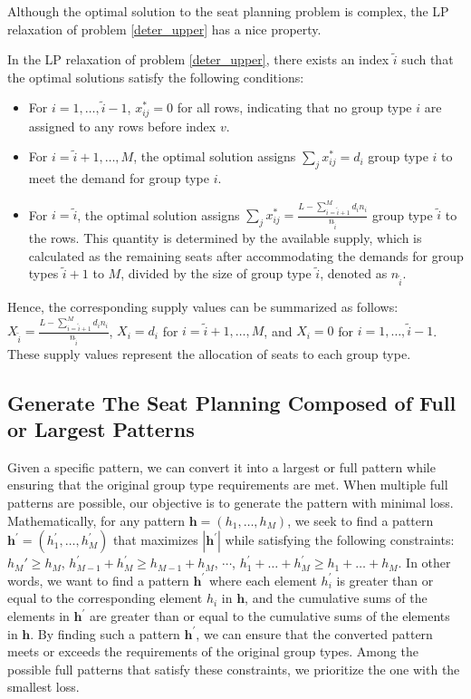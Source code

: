 Although the optimal solution to the seat planning problem is complex, the LP relaxation of problem \eqref{deter_upper} has a nice property.

\begin{prop}\label{sol_relax_deter}
In the LP relaxation of problem \eqref{deter_upper}, there exists an index $\tilde{i}$ such that the optimal solutions satisfy the following conditions:

\begin{itemize}
\item For $i = 1,\ldots, \tilde{i}-1$, $x_{ij}^{*} = 0$ for all rows, indicating that no group type $i$ are assigned to any rows before index $v$.
\item For $i = \tilde{i}+1,\ldots, M$, the optimal solution assigns $\sum_{j} x_{ij}^{*} = d_{i}$ group type $i$ to meet the demand for group type $i$.
\item For $i = \tilde{i}$, the optimal solution assigns $\sum_{j} x_{ij}^{*} = \frac{L - \sum_{i = \tilde{i}+1}^{M} {d_i n_i}}{n_{\tilde{i}}}$ group type $\tilde{i}$ to the rows. This quantity is determined by the available supply, which is calculated as the remaining seats after accommodating the demands for group types $\tilde{i}+1$ to $M$, divided by the size of group type $\tilde{i}$, denoted as $n_{\tilde{i}}$.
\end{itemize}

Hence, the corresponding supply values can be summarized as follows: $X_{\tilde{i}} = \frac{L - \sum_{i = \tilde{i}+1}^{M} {d_i n_i}}{n_{\tilde{i}}}$, $X_{i} = d_{i}$ for $i = \tilde{i} +1,\ldots, M$, and $X_{i} = 0$ for $i = 1, \ldots, \tilde{i}-1$. These supply values represent the allocation of seats to each group type.
\end{prop}

\subsection{Generate The Seat Planning Composed of Full or Largest Patterns}
Given a specific pattern, we can convert it into a largest or full pattern while ensuring that the original group type requirements are met. When multiple full patterns are possible, our objective is to generate the pattern with minimal loss. Mathematically, for any pattern $\bm{h} = (h_1, \ldots, h_M)$, we seek to find a pattern $\bm{h}^{'} = (h_1^{'}, \ldots, h_M^{'})$ that maximizes $|\bm{h}^{'}|$ while satisfying the following constraints: $h_M{'} \geq h_M$, $h_{M-1}^{'} + h_{M}^{'} \geq h_{M-1} + h_{M}$, $\cdots$, $h_1^{'} + \ldots + h_M^{'} \geq h_1 + \ldots + h_M$. In other words, we want to find a pattern $\bm{h}^{'}$ where each element $h_i^{'}$ is greater than or equal to the corresponding element $h_i$ in $\bm{h}$, and the cumulative sums of the elements in $\bm{h}^{'}$ are greater than or equal to the cumulative sums of the elements in $\bm{h}$.
By finding such a pattern $\bm{h}^{'}$, we can ensure that the converted pattern meets or exceeds the requirements of the original group types. Among the possible full patterns that satisfy these constraints, we prioritize the one with the smallest loss.

